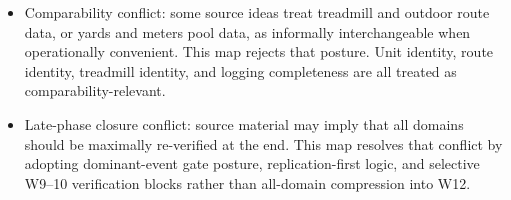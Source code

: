 \documentclass[10pt]{article}
\begin{document}
\begin{itemize}
\item Comparability conflict: some source ideas treat treadmill and outdoor route data, or yards and meters pool data, as informally interchangeable when operationally convenient. This map rejects that posture. Unit identity, route identity, treadmill identity, and logging completeness are all treated as comparability-relevant.

\item Late-phase closure conflict: source material may imply that all domains should be maximally re-verified at the end. This map resolves that conflict by adopting dominant-event gate posture, replication-first logic, and selective W9–10 verification blocks rather than all-domain compression into W12.
\end{itemize}
\end{document}
